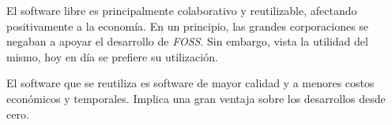 El software libre es principalmente colaborativo y reutilizable, afectando positivamente a la economía. En un principio, las grandes corporaciones se negaban a apoyar el desarrollo de \textit{FOSS}. Sin embargo, vista la utilidad del mismo, hoy en día se prefiere su utilización.

El software que se reutiliza es software de mayor calidad y a menores costos económicos y temporales. Implica una gran ventaja sobre los desarrollos desde cero.